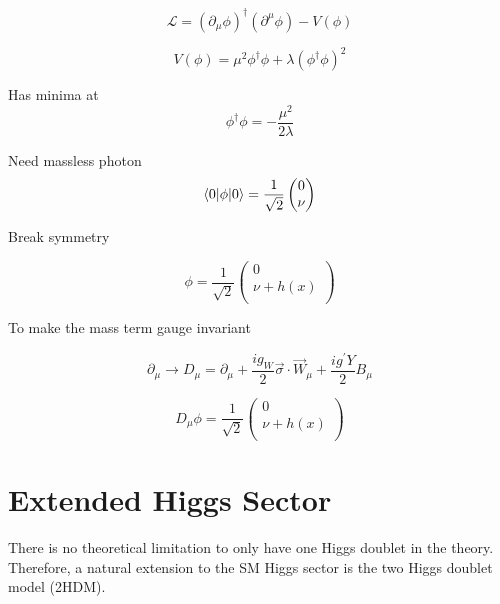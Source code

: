 \begin{equation}
	\mathcal{L} = (\partial_{\mu}\phi)^{\dagger} (\partial^{\mu}\phi) - V(\phi)
\end{equation}

\begin{equation}
V(\phi) = \mu^2 \phi^{\dagger} \phi + \lambda (\phi^{\dagger} \phi)^2
\end{equation}

Has minima at
\begin{equation}
\phi^{\dagger} \phi = -\frac{\mu^2}{2\lambda}
\end{equation}

Need massless photon
\begin{equation}
\braket{0|\phi|0} = \frac{1}{\sqrt{2}}
	\begin{pmatrix} 
		0 \\
		\nu \\
	\end{pmatrix}
\end{equation}

Break symmetry

\begin{equation}
\phi = \frac{1}{\sqrt{2}}
	\begin{pmatrix} 
		0 \\
		\nu + h(x)\\
	\end{pmatrix}
\end{equation}

To make the mass term gauge invariant

\begin{equation}
\partial_{\mu} \rightarrow D_{\mu} = \partial_{\mu} + \frac{i g_{W}}{2} \vec{\sigma} \cdot \vec{W}_{\mu} + \frac{ig^{'}Y}{2} B_{\mu}
\end{equation}

\begin{equation}
D_{\mu}\phi =  \frac{1}{\sqrt{2}}
	\begin{pmatrix} 
		0 \\
		\nu + h(x)\\
	\end{pmatrix}
\end{equation}

\section{Extended Higgs Sector}

There is no theoretical limitation to only have one Higgs doublet in the theory.
Therefore, a natural extension to the SM Higgs sector is the two Higgs doublet model (2HDM).


